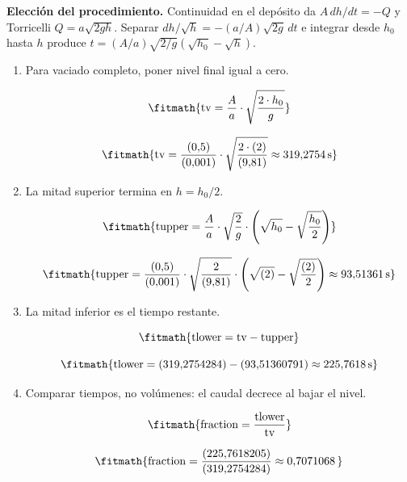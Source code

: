 \noindent\textbf{Elección del procedimiento.} Continuidad en el depósito da $A\,dh/dt=-Q$ y Torricelli $Q=a\sqrt{2gh}$. Separar $dh/\sqrt h=-(a/A)\sqrt{2g}\,dt$ e integrar desde $h_0$ hasta $h$ produce $t=(A/a)\sqrt{2/g}(\sqrt{h_0}-\sqrt h)$.

\begin{enumerate}

\item Para vaciado completo, poner nivel final igual a cero.

\[\fitmath{\mathrm{tv}=\frac{A}{a}\cdot \sqrt{\frac{2\cdot h_{0}}{g}}}\]

\[\fitmath{\mathrm{tv}=\frac{(0{,}5)}{(0{,}001)}\cdot \sqrt{\frac{2\cdot (2)}{(9{,}81)}}\approx 319{,}2754\,\mathrm{s}}\]

\item La mitad superior termina en $h=h_0/2$.

\[\fitmath{\mathrm{tupper}=\frac{A}{a}\cdot \sqrt{\frac{2}{g}}\cdot \left(\sqrt{h_{0}}-\sqrt{\frac{h_{0}}{2}}\right)}\]

\[\fitmath{\mathrm{tupper}=\frac{(0{,}5)}{(0{,}001)}\cdot \sqrt{\frac{2}{(9{,}81)}}\cdot \left(\sqrt{(2)}-\sqrt{\frac{(2)}{2}}\right)\approx 93{,}51361\,\mathrm{s}}\]

\item La mitad inferior es el tiempo restante.

\[\fitmath{\mathrm{tlower}=\mathrm{tv}-\mathrm{tupper}}\]

\[\fitmath{\mathrm{tlower}=(319{,}2754284)-(93{,}51360791)\approx 225{,}7618\,\mathrm{s}}\]

\item Comparar tiempos, no volúmenes: el caudal decrece al bajar el nivel.

\[\fitmath{\mathrm{fraction}=\frac{\mathrm{tlower}}{\mathrm{tv}}}\]

\[\fitmath{\mathrm{fraction}=\frac{(225{,}7618205)}{(319{,}2754284)}\approx 0{,}7071068\,}\]

\end{enumerate}
